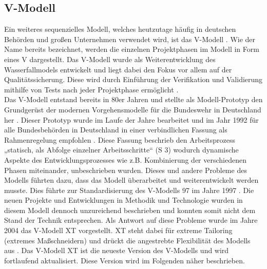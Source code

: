 \subsection{V-Modell}
\label{sec:zusammenarbeit:vModell}
Ein weiteres sequenzielles Modell, welches heutzutage häufig in deutschen Behörden und großen Unternehmen verwendet wird, ist das V-Modell \cite{Hohn:2008:V:}. 
Wie der Name bereits bezeichnet, werden die einzelnen Projektphasen im Modell in Form eines \glqq V\grqq{} dargestellt. 
Das V-Modell wurde als Weiterentwicklung des Wasserfallmodels entwickelt und liegt dabei den Fokus vor allem auf der Qualitätssicherung. 
Diese wird durch Einführung der Verifikation und Validierung mithilfe von Tests nach jeder Projektphase ermöglicht \cite{TryQa:24102022:What:2}\cite{Vans:2014:Software:}.
\\Das V-Modell entstand bereits in 80er Jahren und stellte als Modell-Prototyp den Grundgerüst der modernen Vorgehensmodelle für die Bundeswehr in Deutschland her \cite[1]{Dros:1999:V:}.
Dieser Prototyp wurde im Laufe der Jahre bearbeitet und im Jahr 1992 für alle Bundesbehörden in Deutschland in einer verbindlichen Fassung als Rahmenregelung empfohlen \cite[3]{Dros:1999:V:}. 
Diese Fassung beschrieb den Arbeitsprozess „statisch, als Abfolge einzelner Arbeitsschritte“ \cite{Dros:1999:V:}(S 3) wodurch dynamische Aspekte des Entwicklungsprozesses 
wie z.B. Kombinierung der verschiedenen Phasen miteinander, unbeschrieben wurden. Dieses und andere Probleme des Modells führten dazu, dass das Modell überarbeitet und weiterentwickelt werden musste. 
Dies führte zur Standardisierung des V-Modells 97 im Jahre 1997 \cite[3,4]{Dros:1999:V:}.  
Die neuen Projekte und Entwicklungen in Methodik und Technologie wurden in diesem Modell dennoch unzureichend beschrieben und konnten somit nicht dem Stand der Technik entsprechen. 
Als Antwort auf diese Probleme wurde im Jahre 2004 das V-Modell XT vorgestellt. XT steht dabei für \glqq extreme Tailoring\grqq{} (\glqq extremes Maßschneidern\grqq{}) und drückt die angestrebte Flexibilität 
des Modells aus \cite[3]{Hohn:2008:V:}. Das V-Modell XT ist die neueste Version des V-Modells und wird fortlaufend aktualisiert. Diese Version wird im Folgenden näher beschrieben. 
\\

